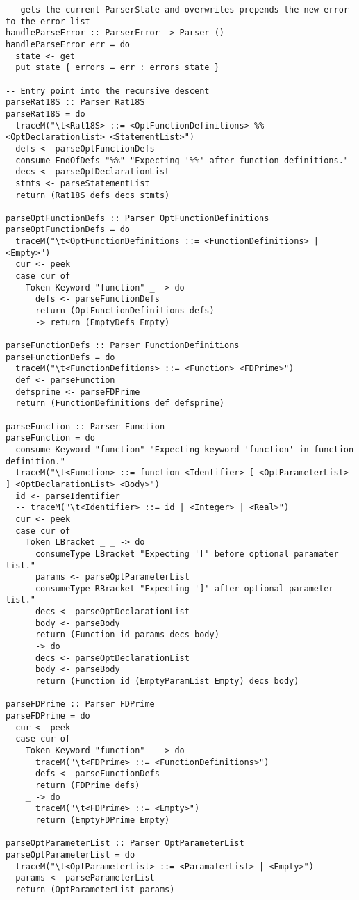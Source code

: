\documentclass[11pt]{article}
\begin{document}
\begin{verbatim}
-- gets the current ParserState and overwrites prepends the new error to the error list
handleParseError :: ParserError -> Parser ()
handleParseError err = do
  state <- get
  put state { errors = err : errors state }

-- Entry point into the recursive descent
parseRat18S :: Parser Rat18S
parseRat18S = do
  traceM("\t<Rat18S> ::= <OptFunctionDefinitions> %% <OptDeclarationlist> <StatementList>")
  defs <- parseOptFunctionDefs
  consume EndOfDefs "%%" "Expecting '%%' after function definitions."
  decs <- parseOptDeclarationList
  stmts <- parseStatementList
  return (Rat18S defs decs stmts)

parseOptFunctionDefs :: Parser OptFunctionDefinitions
parseOptFunctionDefs = do
  traceM("\t<OptFunctionDefinitions ::= <FunctionDefinitions> | <Empty>")
  cur <- peek
  case cur of
    Token Keyword "function" _ -> do
      defs <- parseFunctionDefs
      return (OptFunctionDefinitions defs)
    _ -> return (EmptyDefs Empty)

parseFunctionDefs :: Parser FunctionDefinitions
parseFunctionDefs = do
  traceM("\t<FunctionDefitions> ::= <Function> <FDPrime>")
  def <- parseFunction
  defsprime <- parseFDPrime
  return (FunctionDefinitions def defsprime)

parseFunction :: Parser Function
parseFunction = do
  consume Keyword "function" "Expecting keyword 'function' in function definition."
  traceM("\t<Function> ::= function <Identifier> [ <OptParameterList> ] <OptDeclarationList> <Body>")
  id <- parseIdentifier
  -- traceM("\t<Identifier> ::= id | <Integer> | <Real>")
  cur <- peek
  case cur of
    Token LBracket _ _ -> do
      consumeType LBracket "Expecting '[' before optional paramater list."
      params <- parseOptParameterList
      consumeType RBracket "Expecting ']' after optional parameter list."
      decs <- parseOptDeclarationList
      body <- parseBody
      return (Function id params decs body)
    _ -> do
      decs <- parseOptDeclarationList
      body <- parseBody
      return (Function id (EmptyParamList Empty) decs body)

parseFDPrime :: Parser FDPrime
parseFDPrime = do
  cur <- peek
  case cur of
    Token Keyword "function" _ -> do
      traceM("\t<FDPrime> ::= <FunctionDefinitions>")
      defs <- parseFunctionDefs
      return (FDPrime defs)
    _ -> do
      traceM("\t<FDPrime> ::= <Empty>")
      return (EmptyFDPrime Empty)

parseOptParameterList :: Parser OptParameterList
parseOptParameterList = do
  traceM("\t<OptParameterList> ::= <ParamaterList> | <Empty>")
  params <- parseParameterList
  return (OptParameterList params)


\end{verbatim}
\end{document}
